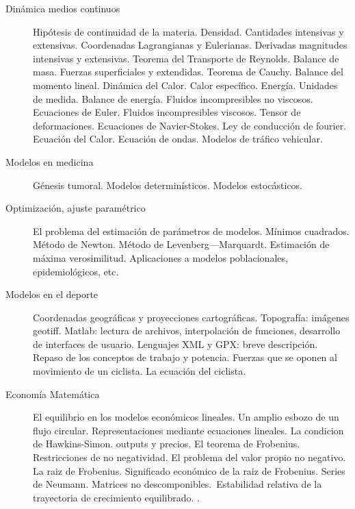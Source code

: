 \documentclass[12pt]{article}
\begin{document}
\begin{enumerate}
\begin{description}
\item[Dinámica medios continuos] Hipótesis de continuidad de la materia. Densidad. Cantidades intensivas y extensivas. Coordenadas Lagrangianas y Eulerianas. Derivadas magnitudes intensivas y extensivas. Teorema del Transporte de Reynolds.  Balance  de  masa. Fuerzas superficiales y extendidas. Teorema de Cauchy. Balance del momento lineal. Dinámica del Calor.  Calor específico. Energía. Unidades de medida.    Balance de energía. Fluidos incompresibles no viscosos.  Ecuaciones de Euler.  Fluidos incompresibles  viscosos. Tensor de deformaciones. Ecuaciones de Navier-Stokes. Ley de conducción de fourier. Ecuación del Calor. Ecuación de ondas. Modelos de tráfico vehicular.\cite{MarkH.Holmes706,JacekBanasiak709, MartinBraun727,bellomo1994modelling,AlexandreJ.Chorin749,FridtjovIrgens750,MichaelGriebel751,GiovanniP.Galdi752,PieterWesseling754,RichardHaberman712,C.C.Lin720}


\item[Modelos en medicina] Génesis tumoral. Modelos determinísticos. Modelos estocásticos.     \cite{DominikWodarz734,EmmanuelBarillot736,M.Eisen733,JamesD.Murray744,W.Y.Tan732}

\item[Optimización, ajuste paramétrico] \cite{EdwardA.Bender715,NeilA.Gershenfeld717,OdoDiekmann614,LyleD.Broemeling615}
El problema del estimación de parámetros  de modelos. Mínimos cuadrados. Método de Newton.  
Método de Levenberg—Marquardt. Estimación de máxima verosimilitud.  Aplicaciones a modelos
poblacionales, epidemiológicos, etc. 


\item[Modelos en el deporte] Coordenadas geográficas y proyecciones cartográficas. Topografía: imágenes geotiff. Matlab: lectura de archivos, interpolación de funciones, desarrollo de interfaces de usuario. Lenguajes  XML y GPX: breve descripción. Repaso de los conceptos de trabajo y potencia. Fuerzas que se oponen al movimiento de un ciclista. La ecuación del ciclista. \cite{wilson2004bicycling}

\item[Economía Matemática]  El equilibrio en los modelos económicos lineales. Un amplio esbozo de un flujo circular. Representaciones mediante ecuaciones lineales. La condicion de Hawkins-Simon. outputs y precios.  El teorema de Frobenius. Restricciones de no negatividad. El problema del valor propio no negativo. La raiz de Frobenius. Significado económico de la raiz de Frobenius. Series de Neumann. Matrices no descomponibles. Estabilidad relativa de la trayectoria de crecimiento equilibrado. \cite{Nikaido}.



\end{description}



  


\end{enumerate}





 
 

 








\end{document}

